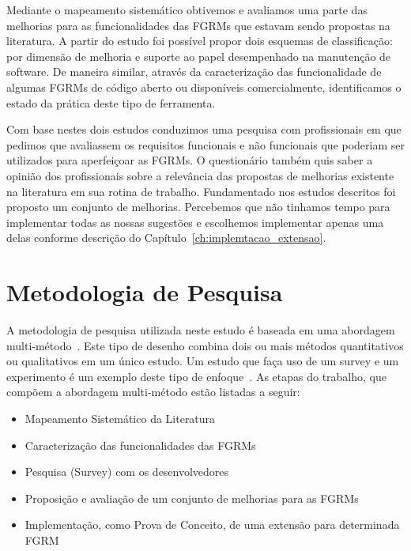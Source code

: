Mediante o mapeamento sistemático obtivemos e avaliamos uma parte das melhorias
para as funcionalidades das FGRMs que estavam sendo propostas na literatura. A
partir do estudo foi possível propor dois esquemas de classificação: por
dimensão de melhoria e suporte ao papel desempenhado na manutenção de software.
De maneira similar, através da caracterização das funcionalidade de algumas
FGRMs de código aberto ou disponíveis comercialmente, identificamos o estado da
prática deste tipo de ferramenta.

Com base nestes dois estudos conduzimos uma pesquisa com profissionais em que
pedimos que avaliassem os requisitos funcionais e não funcionais que poderiam
ser utilizados para aperfeiçoar as FGRMs. O questionário também quis saber a
opinião dos profissionais sobre a relevância das propostas de me\-lho\-ri\-as
existente na literatura em sua rotina de trabalho. Fundamentado nos estudos
descritos foi proposto um conjunto de melhorias. Percebemos que não tinhamos
tempo para implementar todas as nossas sugestões e escolhemos implementar apenas
uma delas conforme descrição do Capítulo~\ref{ch:implemtacao_extensao}.

\section{Metodologia de Pesquisa}
\label{sec:intro-metodologia}


A metodologia de pesquisa utilizada neste estudo é baseada em uma abordagem
multi-método~\cite{hesse2010mixed}. Este tipo de desenho combina dois ou mais
métodos quantitativos ou qualitativos em um único estudo. Um estudo que faça uso
de um survey e um experimento é um exemplo deste tipo de
enfoque~\cite{hesse2010mixed}. As etapas do trabalho, que compõem a abordagem
multi-método estão listadas a seguir:

\begin{itemize}[(i)]
	\item Mapeamento Sistemático da Literatura~\cite{Petersen2008}
	\item Caracterização das funcionalidades das FGRMs
	\item Pesquisa (Survey) com os
		desenvolvedores~\cite{wohlin2012experimentation}
	\item Proposição e avaliação de um conjunto de melhorias para as FGRMs
    \item Implementação, como Prova de Conceito, de uma extensão para
        determinada FGRM
\end{itemize}

